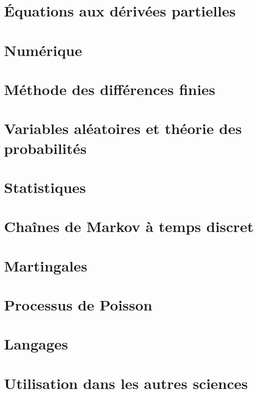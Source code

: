 \documentclass[a4paper,twoside,11pt]{book}
\begin{document}
\chapter{Équations aux dérivées partielles}


\chapter{Numérique}





\chapter{Méthode des différences finies}


\chapter{Variables aléatoires et théorie des probabilités}





\chapter{Statistiques}


\chapter{Chaînes de Markov à temps discret}


\chapter{Martingales}


\chapter{Processus de Poisson}


\chapter{Langages}


\chapter{Utilisation dans les autres sciences}


\end{document}
